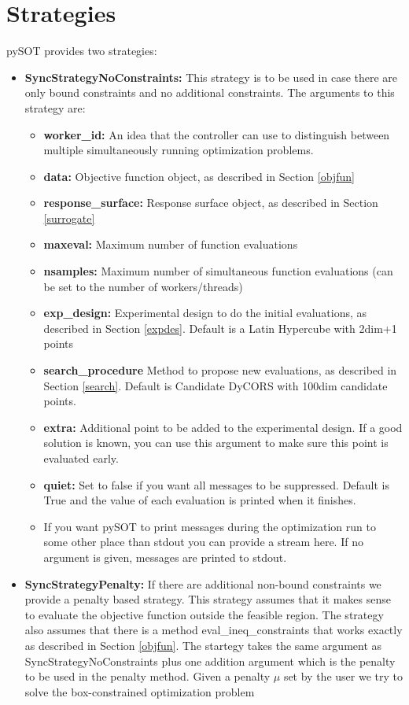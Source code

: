 \documentclass[]{article}
\begin{document}
\section{Strategies} pySOT provides two strategies:
\begin{itemize}
\item \textbf{SyncStrategyNoConstraints:} This strategy is to be used in case there are only bound constraints and no additional constraints. The arguments to this strategy are:
\begin{itemize}
\item \textbf{worker\_id:} An idea that the controller can use to distinguish between multiple simultaneously running optimization problems.
\item \textbf{data:} Objective function object, as described in Section \ref{objfun}
\item \textbf{response\_surface:} Response surface object, as described in Section \ref{surrogate}
\item \textbf{maxeval:} Maximum number of function evaluations
\item \textbf{nsamples:} Maximum number of simultaneous function evaluations (can be set to the number of workers/threads)
\item \textbf{exp\_design:} Experimental design to do the initial evaluations, as described in Section \ref{expdes}. Default is a Latin Hypercube with 2dim+1 points
\item \textbf{search\_procedure} Method to propose new evaluations, as described in Section \ref{search}. Default is Candidate DyCORS with 100dim candidate points.
\item \textbf{extra:} Additional point to be added to the experimental design. If a good solution is known, you can use this argument to make sure this point is evaluated early. 
\item \textbf{quiet:} Set to false if you want all messages to be suppressed. Default is True and the value of each evaluation is printed when it finishes.
\item {} If you want pySOT to print messages during the optimization run to some other place than stdout you can provide a stream here. If no argument is given, messages are printed to stdout.
\end{itemize}
\item \textbf{SyncStrategyPenalty:} If there are additional non-bound constraints we provide a penalty based strategy. This strategy assumes that it makes sense to evaluate the objective function outside the feasible region. The strategy also assumes that there is a method eval\_ineq\_constraints that works exactly as described in Section \ref{objfun}. The startegy takes the same argument as SyncStrategyNoConstraints plus one addition argument which is the penalty to be used in the penalty method. Given a penalty $\mu$ set by the user we try to solve the box-constrained optimization problem 

\end{itemize}
\end{document}
